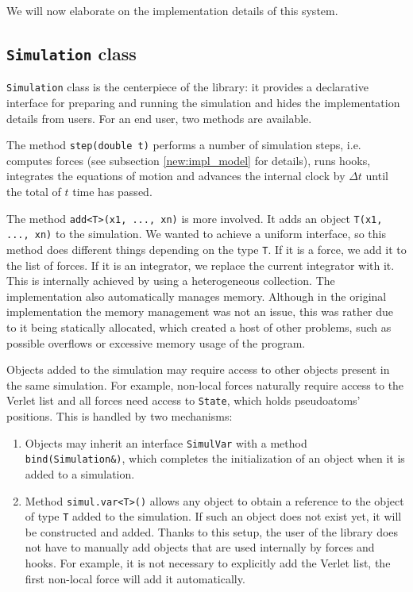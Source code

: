 We will now elaborate on the implementation details of this system.

\subsection{\texttt{Simulation} class}
\texttt{Simulation} class is the centerpiece of the library: it provides a declarative interface for preparing and running the simulation and hides the implementation details from users. For an end user, two methods are available.

The method \texttt{step(double t)} performs a number of simulation steps, i.e. computes forces (see subsection \ref{new:impl_model} for details), runs hooks, integrates the equations of motion and advances the internal clock by $\Delta t$ until the total of $t$ time has passed.

The method \texttt{add<T>(x1, ..., xn)} is more involved. It adds an object \texttt{T(x1, ..., xn)} to the simulation. We wanted to achieve a uniform interface, so this method does different things depending on the type \texttt{T}. If it is a force, we add it to the list of forces. If it is an integrator, we replace the current integrator with it. This is internally achieved by using a heterogeneous collection. The implementation also automatically manages memory. Although in the original implementation the memory management was not an issue, this was rather due to it being statically allocated, which created a host of other problems, such as possible overflows or excessive memory usage of the program.

Objects added to the simulation may require access to other objects present in the same simulation. For example, non-local forces naturally require access to the Verlet list and all forces need access to \texttt{State}, which holds pseudoatoms' positions. This is handled by two mechanisms:

\begin{enumerate}
    \item Objects may inherit an interface \texttt{SimulVar} with a method \texttt{bind(Simulation\&)}, which completes the initialization of an object when it is added to a simulation.
    \item Method \texttt{simul.var<T>()} allows any object to obtain a reference to the object of type \texttt{T} added to the simulation. If such an object does not exist yet, it will be constructed and added. Thanks to this setup, the user of the library does not have to manually add objects that are used internally by forces and hooks. For example, it is not necessary to explicitly add the Verlet list, the first non-local force will add it automatically.
\end{enumerate}

